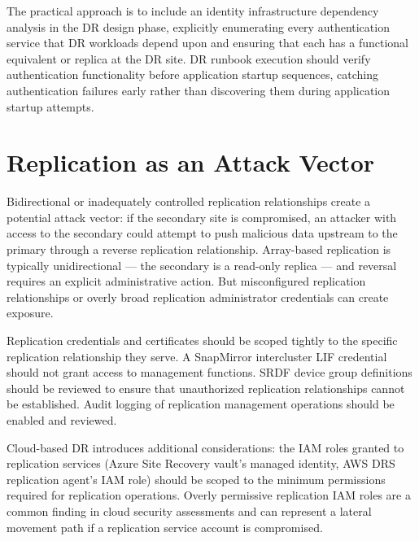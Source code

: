 The practical approach is to include an identity infrastructure dependency analysis in the DR design phase, explicitly enumerating every authentication service that DR workloads depend upon and ensuring that each has a functional equivalent or replica at the DR site. DR runbook execution should verify authentication functionality before application startup sequences, catching authentication failures early rather than discovering them during application startup attempts.

\section{Replication as an Attack Vector}
Bidirectional or inadequately controlled replication relationships create a potential attack vector: if the secondary site is compromised, an attacker with access to the secondary could attempt to push malicious data upstream to the primary through a reverse replication relationship. Array-based replication is typically unidirectional --- the secondary is a read-only replica --- and reversal requires an explicit administrative action. But misconfigured replication relationships or overly broad replication administrator credentials can create exposure.

Replication credentials and certificates should be scoped tightly to the specific replication relationship they serve. A SnapMirror intercluster LIF credential should not grant access to management functions. SRDF device group definitions should be reviewed to ensure that unauthorized replication relationships cannot be established. Audit logging of replication management operations should be enabled and reviewed.

Cloud-based DR introduces additional considerations: the IAM roles granted to replication services (Azure Site Recovery vault's managed identity, AWS DRS replication agent's IAM role) should be scoped to the minimum permissions required for replication operations. Overly permissive replication IAM roles are a common finding in cloud security assessments and can represent a lateral movement path if a replication service account is compromised.

